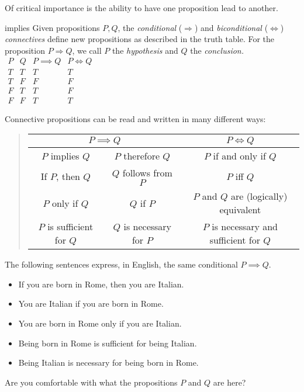 Of critical importance is the ability to have one proposition lead to another.

\begin{defn}[lower separated=false, sidebyside, sidebyside align=top seam, sidebyside gap=0pt, righthand width=0.37\linewidth]{}{implies}
	Given propositions $P,Q$, the \emph{conditional} ($\Longrightarrow$) and \emph{biconditional} ($\Longleftrightarrow$) \emph{connectives} define new propositions as described in the truth table.\smallbreak
	For the proposition $P\Longrightarrow Q$, we call $P$ the \emph{hypothesis} and $Q$ the \emph{conclusion.}
	\tcblower
	\flushright$\begin{array}{cc||c|c}
	P & Q & P\implies Q & P\iff Q\\\hline
	T & T & T & T\\
	T & F & F & F\\
	F & T & T & F\\
	F & F & T & T
	\end{array}$
\end{defn}


Connective propositions can be read and written in many different ways:
\begin{quote}
	\def\arraystretch{1.05}
	\begin{tabular}{@{}cc|c}
		\multicolumn{2}{c|}{$P\implies Q$} & $P\iff Q$\\\hline
		$P$ implies $Q$ & $P$ therefore $Q$ & $P$ if and only if $Q$\\
		If $P$, then $Q$ & $Q$ follows from $P$ & $P$ iff $Q$\\
		$P$ only if $Q$ & $Q$ if $P$ & $P$ and $Q$ are (logically) equivalent\\
		$P$ is sufficient for $Q$ & $Q$ is necessary for $P$ & $P$ is necessary and sufficient for $Q$
	\end{tabular}
\end{quote}


\begin{example}{}{}
	The following sentences express, in English, the same conditional $P\implies Q$.\vspace{-1pt}
	\begin{itemize}\itemsep1pt
		\item If you are born in Rome, then you are Italian. 
		\item You are Italian if you are born in Rome. 
		\item You are born in Rome only if you are Italian. 
		\item Being born in Rome is sufficient for being Italian. 
		\item Being Italian is necessary for being born in Rome.\vspace{-1pt} 
	\end{itemize}
	Are you comfortable with what the propositions $P$ and $Q$ are here?
\end{example}



